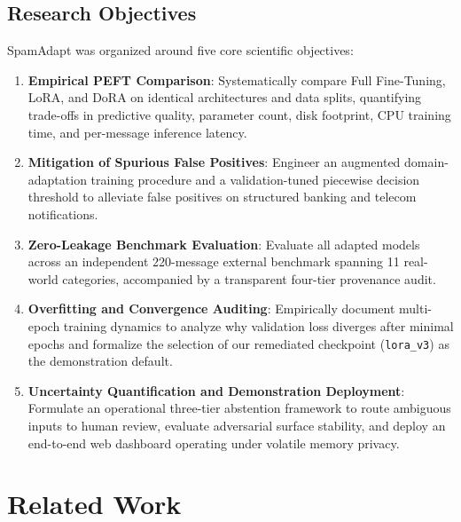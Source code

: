 \documentclass[conference]{IEEEtran}
\begin{document}
\subsection{Research Objectives}
SpamAdapt was organized around five core scientific objectives:
\begin{enumerate}
    \item \textbf{Empirical PEFT Comparison}: Systematically compare Full Fine-Tuning, LoRA, and DoRA on identical architectures and data splits, quantifying trade-offs in predictive quality, parameter count, disk footprint, CPU training time, and per-message inference latency.
    \item \textbf{Mitigation of Spurious False Positives}: Engineer an augmented domain-adaptation training procedure and a validation-tuned piecewise decision threshold to alleviate false positives on structured banking and telecom notifications.
    \item \textbf{Zero-Leakage Benchmark Evaluation}: Evaluate all adapted models across an independent 220-message external benchmark spanning 11 real-world categories, accompanied by a transparent four-tier provenance audit.
    \item \textbf{Overfitting and Convergence Auditing}: Empirically document multi-epoch training dynamics to analyze why validation loss diverges after minimal epochs and formalize the selection of our remediated checkpoint (\texttt{lora\_v3}) as the demonstration default.
    \item \textbf{Uncertainty Quantification and Demonstration Deployment}: Formulate an operational three-tier abstention framework to route ambiguous inputs to human review, evaluate adversarial surface stability, and deploy an end-to-end web dashboard operating under volatile memory privacy.
\end{enumerate}

\section{Related Work}
\label{sec:related_work}
\end{document}
